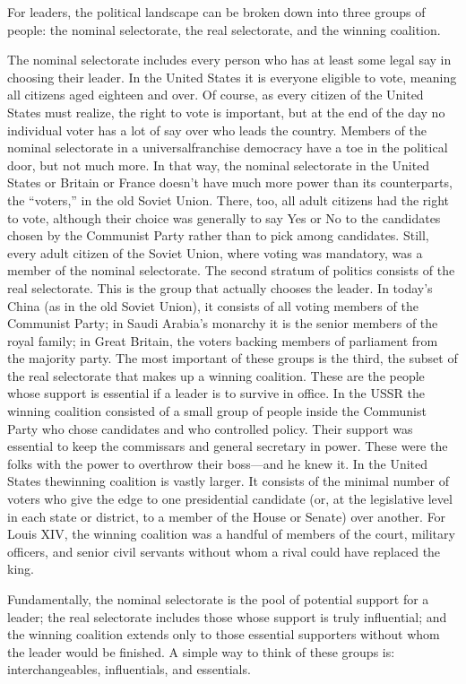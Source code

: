 \documentclass[10pt]{article}
\begin{document}
{\large For leaders, the political landscape can be broken down into three
groups of people: the nominal selectorate, the real selectorate, and the winning
coalition.}

{\large The nominal selectorate includes every person who has at least some
legal say in choosing their leader. In the United States it is everyone eligible
to vote, meaning all citizens aged eighteen and over. Of course, as every citizen
of the United States must realize, the right to vote is important, but at the end
of the day no individual voter has a lot of say over who leads the country.
Members of the nominal selectorate in a universalfranchise democracy have a toe
in the political door, but not much more. In that way, the nominal selectorate in
the United States or Britain or France doesn't have much more power than its
counterparts, the ``voters,'' in the old Soviet Union. There, too, all adult
citizens had the right to vote, although their choice was generally to say Yes or
No to the candidates chosen by the Communist Party rather than to pick among
candidates. Still, every adult citizen of the Soviet Union, where voting was
mandatory, was a member of the nominal selectorate. The second stratum of
politics consists of the real selectorate. This is the group that actually
chooses the leader. In today's China (as in the old Soviet Union), it consists of
all voting members of the Communist Party; in Saudi Arabia's monarchy it is the
senior members of the royal family; in Great Britain, the voters backing members
of parliament from the majority party. The most important of these groups is the
third, the subset of the real selectorate that makes up a winning coalition.
These are the people whose support is essential if a leader is to survive in
office. In the USSR the winning coalition consisted of a small group of people
inside the Communist Party who chose candidates and who controlled policy. Their
support was essential to keep the commissars and general secretary in power.
These were the folks with the power to overthrow their boss---and he knew it. In
the United States thewinning coalition is vastly larger. It consists of the
minimal number of voters who give the edge to one presidential candidate (or, at
the legislative level in each state or district, to a member of the House or
Senate) over another. For Louis XIV, the winning coalition was a handful of
members of the court, military officers, and senior civil servants without whom a
rival could have replaced the king.}

{\large Fundamentally, the nominal selectorate is the pool of potential support
for a leader; the real selectorate includes those whose support is truly
influential; and the winning coalition extends only to those essential supporters
without whom the leader would be finished. A simple way to think of these groups
is: interchangeables, influentials, and essentials.}
\end{document}
